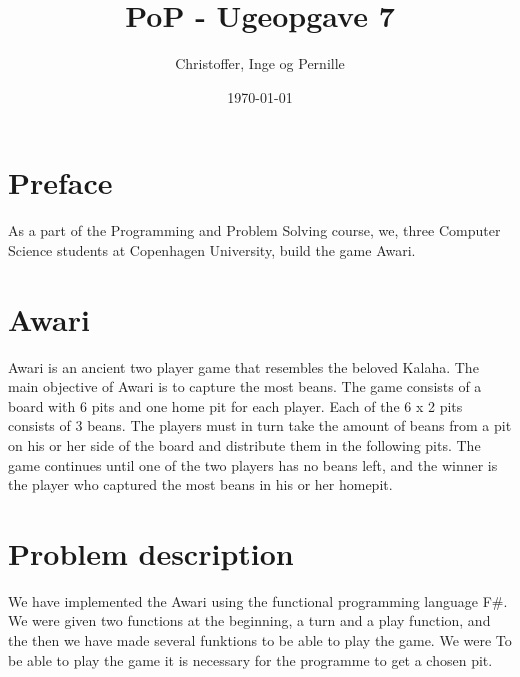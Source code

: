 \documentclass[a4paper]{report}
\title{PoP - Ugeopgave 7}
\author{Christoffer, Inge og Pernille}
\date{\today}
\begin{document}
\maketitle

\section{Preface}
As a part of the Programming and Problem Solving course, we,
three Computer Science students at Copenhagen University, build the game Awari.

\section{Awari}
Awari is an ancient two player game that resembles the beloved Kalaha. The main
objective of Awari is to capture the most beans. The game consists of a board
with 6 pits and one home pit for each player. Each of the 6 x 2 pits consists of
3 beans. The players must in turn take the amount of beans from a pit on his or
her side of the board and distribute them in the following pits. The game
continues until one of the two players has no beans left, and the winner is the
player who captured the most beans in his or her homepit.

\section{Problem description}
We have implemented the Awari using the functional programming language F\#. We
were given two functions at the beginning, a turn and a play function, and the
then we have made several funktions to be able to play the game. We were 
To be able to play the game it is necessary for the programme to get a chosen pit.


\lstset{language=FSharp}

\end{document}
